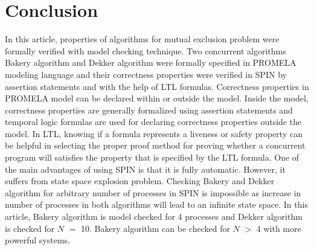 \documentclass[conference]{IEEEtran}
\begin{document}
\section{Conclusion}
In this article, properties of algorithms for mutual exclusion problem were formally verified with model checking technique. 
Two concurrent algorithms Bakery algorithm and Dekker algorithm were formally specified in PROMELA modeling language and their
correctness properties were verified in SPIN by assertion statements and with the help of LTL formulas. Correctness properties
in PROMELA model can be declared within or outside the model. Inside the model, correctness properties are generally formalized using 
assertion statements and temporal logic formulas are used for declaring correctness properties outside the model. 
In LTL, knowing if a formula represents a liveness or safety property can be helpful in selecting the proper proof method for proving
whether a concurrent program will satisfies the property that is specified by the LTL formula. One of the main advantages of using SPIN 
is that it is fully automatic. However, it suffers from state space explosion problem. Checking Bakery and Dekker algorithm for arbitrary 
number of processes in SPIN is impossible as increase in number of processes in both algorithms will lead to an infinite state space.
In this article, Bakery algorithm is model checked for 4 processes and Dekker algorithm is checked for $N$ $=$ 10. Bakery algorithm can be checked 
for $N$ $>$ 4 with more powerful systems. 
\end{document}
